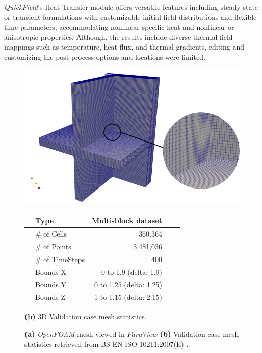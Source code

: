 \textit{QuickField}'s Heat Transfer module offers versatile features including steady-state or transient formulations with customizable initial field distributions and flexible time parameters, accommodating nonlinear specific heat and nonlinear or anisotropic properties. Although, the results include diverse thermal field mappings such as temperature, heat flux, and thermal gradients, editing and customizing the post-process options and locations were limited.



\begin{figure}[htb]
    \centering
    \begin{minipage}[t]{0.75\columnwidth}
        \centering
        \includegraphics[width=\linewidth]{Figures/mesh3.png}
    \end{minipage}
    \hfill
    \begin{minipage}[t]{0.5\columnwidth}
        \centering
        \begin{tabular}{clrrr}    
            \toprule
            & Type       & Multi-block dataset   \\ \midrule
            & \# of Cells & 360,364                      \\
            & \# of Points                        & 3,481,036                  \\
            & \# of TimeSteps                  & 400                        \\
            & Bounds X          & 0 to 1.9 (delta: 1.9) \\
            & Bounds Y          &                     0 to 1.25 (delta: 1.25) \\
            & Bounds Z          &                     -1 to 1.15 (delta: 2.15)    \\  \bottomrule
        \end{tabular}
        \caption*{\textbf{(b)} 3D Validation case mesh statistics.}
        \label{tab:mesh-stats}
    \end{minipage}
    
    \caption[3D Validation Mesh and Mesh Statistics]{\textbf{(a)} \textit{OpenFOAM} mesh viewed in $ParaView$ \textbf{(b)}  Validation case mesh statistics retrieved from BS EN ISO 10211:2007(E) \cite{ISO}.}
    \label{fig:validation-case}
\end{figure}




